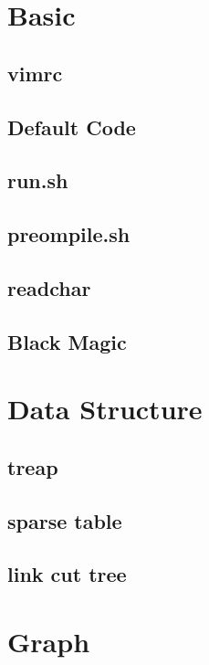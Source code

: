 \section{Basic}
\subsection{vimrc}

\subsection{Default Code}

\subsection{run.sh}

\subsection{preompile.sh}

\subsection{readchar}

\subsection{Black Magic}


\section{Data Structure}
\subsection{treap}

\subsection{sparse table}

\subsection{link cut tree}


\section{Graph}
